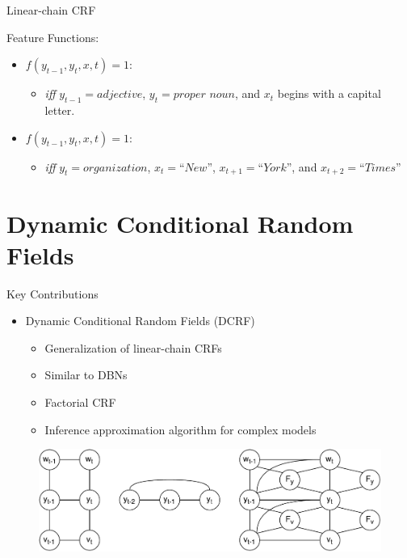 \documentclass[presentation,bigger]{beamer}
\begin{document}
\begin{frame}[label={sec:orgheadline8}]{Linear-chain CRF}
\begin{block}{Feature Functions:}
\begin{itemize}
\item \(f(y_{t-1}, y_t, x, t) = 1\):
\begin{itemize}
\item \emph{iff} \(y_{t-1} = adjective\), \(y_t = \textit{proper noun}\), and \(x_t\) begins with a capital letter.
\end{itemize}
\item \(f(y_{t-1}, y_t, x, t) = 1\):
\begin{itemize}
\item \emph{iff} \(y_t = \textit{organization}\), \(x_{t} = \textit{``New''}\), \(x_{t+1} = \textit{``York''}\), and \(x_{t+2} = \textit{``Times''}\)
\end{itemize}
\end{itemize}
\end{block}
\end{frame}
\section{Dynamic Conditional Random Fields}
\label{sec:orgheadline20}
\begin{frame}[label={sec:orgheadline10}]{Key Contributions}
\begin{itemize}
\item Dynamic Conditional Random Fields (DCRF)
\begin{itemize}
\item Generalization of linear-chain CRFs
\item Similar to DBNs
\item Factorial CRF
\item Inference approximation algorithm for complex models
\end{itemize}
\end{itemize}
\begin{figure}[htb]
\centering
\includegraphics[width=\textwidth]{figures/DCRF.pdf}
\end{figure}
\end{frame}
\end{document}
